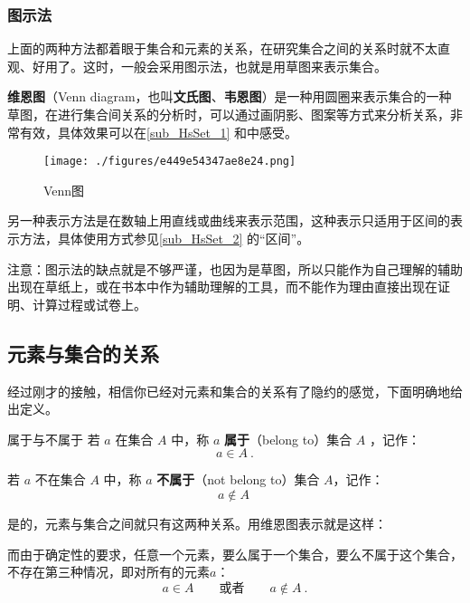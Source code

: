 \subsubsection{图示法}
上面的两种方法都着眼于集合和元素的关系，在研究集合之间的关系时就不太直观、好用了。这时，一般会采用图示法，也就是用草图来表示集合。

\textbf{维恩图}（Venn diagram，也叫\textbf{文氏图}、\textbf{韦恩图}）是一种用圆圈来表示集合的一种草图，在进行集合间关系的分析时，可以通过画阴影、图案等方式来分析关系，非常有效，具体效果可以在\autoref{sub_HsSet_1} 和中感受。
\begin{figure}[ht]
\centering
\texttt{[image: ./figures/e449e54347ae8e24.png]}
\caption{Venn图} \label{fig_SufCnd_1}
\end{figure}

另一种表示方法是在数轴上用直线或曲线来表示范围，这种表示只适用于区间的表示方法，具体使用方式参见\autoref{sub_HsSet_2} 的“区间”。

注意：图示法的缺点就是不够严谨，也因为是草图，所以只能作为自己理解的辅助出现在草纸上，或在书本中作为辅助理解的工具，而不能作为理由直接出现在证明、计算过程或试卷上。

\subsection{元素与集合的关系}

经过刚才的接触，相信你已经对元素和集合的关系有了隐约的感觉，下面明确地给出定义。

\begin{definition}{属于与不属于}
若 $a$ 在集合 $A$ 中，称 $a$ \textbf{属于}（belong to）集合 $A$ ，记作：
\begin{equation}
a \in A~.
\end{equation}

若 $a$ 不在集合 $A$ 中，称 $a$ \textbf{不属于}（not belong to）集合 $A$，记作：
\begin{equation}
a\notin A~
\end{equation}
\end{definition}
是的，元素与集合之间就只有这两种关系。用维恩图表示就是这样：

而由于确定性的要求，任意一个元素，要么属于一个集合，要么不属于这个集合，不存在第三种情况，即对所有的元素$a$：
\begin{equation}
a\in A\qquad\text{或者}\qquad a\not\in A~.
\end{equation}

